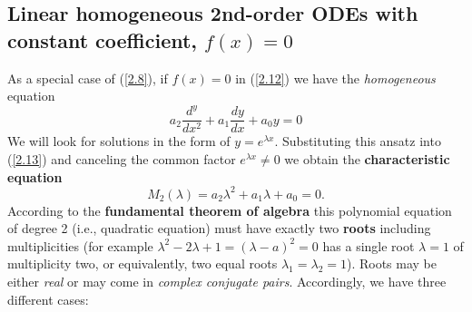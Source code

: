 \documentclass[11pt,a4paper]{article}
\begin{document}
	\subsection{Linear homogeneous 2nd-order ODEs with constant coefficient, $f(x) = 0$}
	As a special case of (\ref{2.8}), if $f(x) = 0$ in (\ref{2.12}) we have the \textit{homogeneous} equation
	\begin{equation}\label{2.13}
		a_2\frac{d^y}{dx^2}+a_1\frac{dy}{dx}+a_0y = 0
	\end{equation}
	We will look for solutions in the form of $y=e^{\lambda x}$. Substituting this ansatz into (\ref{2.13}) and canceling the common factor $e^{\lambda x} \neq 0$ we obtain the \textbf{characteristic equation}
	\begin{equation}\label{2.14}
		M_2(\lambda) = a_2\lambda ^2 +a_1\lambda + a_0 = 0.
	\end{equation}
	According to the \textbf{fundamental theorem of algebra} this polynomial equation of degree 2 (i.e., quadratic equation) must have exactly two \textbf{roots} including multiplicities (for example $\lambda^2-2\lambda+1 = (\lambda-a)^2=0$ has a single root $\lambda = 1$ of multiplicity two, or equivalently, two equal roots $\lambda_1 = \lambda_2 = 1$). Roots may be either \textit{real} or may come in \textit{complex conjugate pairs}. Accordingly, we have three different cases:
\end{document}
